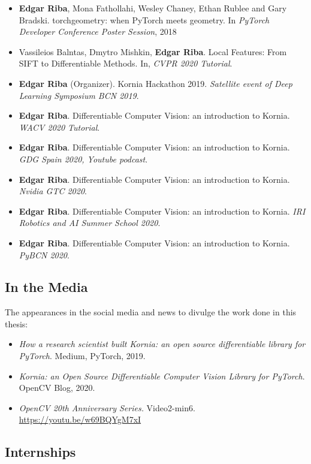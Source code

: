 \begin{itemize}
\item \textbf{Edgar Riba}, Mona Fathollahi, Wesley Chaney, Ethan Rublee and Gary Bradski. torchgeometry: when PyTorch meets geometry. In \textit{PyTorch Developer Conference Poster Session}, 2018
\item Vassileios Balntas, Dmytro Mishkin, \textbf{Edgar Riba}. Local Features: From SIFT to Differentiable Methods. In, \textit{CVPR 2020 Tutorial}.
\item  \textbf{Edgar Riba} (Organizer). Kornia Hackathon 2019. \textit{Satellite event of Deep Learning Symposium BCN 2019}.
\item \textbf{Edgar Riba}. Differentiable Computer Vision: an introduction to Kornia. \textit{WACV 2020 Tutorial}.
\item \textbf{Edgar Riba}. Differentiable Computer Vision: an introduction to Kornia. \textit{GDG Spain 2020, Youtube podcast}.
\item \textbf{Edgar Riba}. Differentiable Computer Vision: an introduction to Kornia. \textit{Nvidia GTC 2020}.
\item \textbf{Edgar Riba}. Differentiable Computer Vision: an introduction to Kornia. \textit{IRI Robotics and AI Summer School 2020}.
\item \textbf{Edgar Riba}. Differentiable Computer Vision: an introduction to Kornia. \textit{PyBCN 2020}.
\end{itemize}

\subsection{In the Media}

The appearances in the social media and news to divulge the work done in this thesis:

\begin{itemize}
\item \textit{How a research scientist built Kornia: an open source differentiable library for PyTorch}. Medium, PyTorch, 2019.
\item \textit{Kornia: an Open Source Differentiable Computer Vision Library for PyTorch}. OpenCV Blog, 2020.
\item \textit{OpenCV 20th Anniversary Series.} Video2-min6. \url{https://youtu.be/w69BQYgM7xI}
\end{itemize}

\subsection{Internships}

